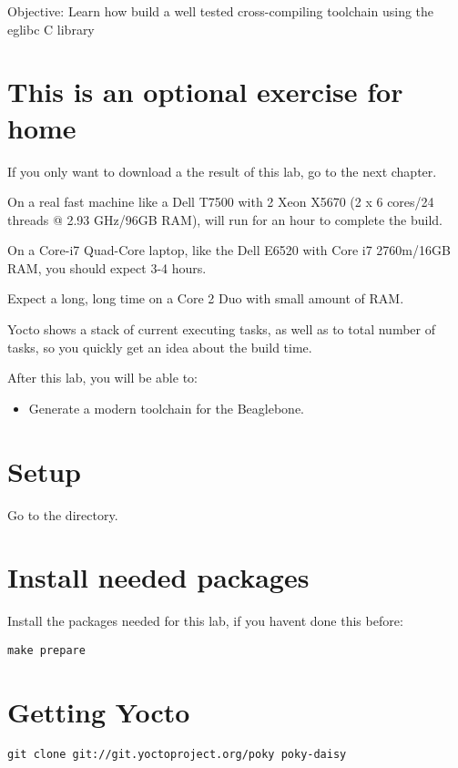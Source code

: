   {Objective: Learn how build a well tested cross-compiling toolchain using the eglibc C
  library}

\section{This is an optional exercise for home}

If you only want to download a the result of this lab, go to the next chapter.

On a real fast machine like a Dell T7500 with 2 Xeon X5670 (2 x 6 cores/24 threads @ 2.93 GHz/96GB RAM),
 will run for an hour to complete the build.

On a Core-i7 Quad-Core laptop, like the Dell E6520 with Core i7 2760m/16GB RAM, you should expect 3-4 hours.

Expect a long, long time on a Core 2 Duo with small amount of RAM.

Yocto shows a stack of current executing tasks, as well as to total number of tasks,
so you quickly get an idea about the build time.

After this lab, you will be able to:

\begin{itemize}
\item Generate a modern toolchain for the Beaglebone.
\end{itemize}

\section{Setup}

Go to the \labdir directory.

\section{Install needed packages}

Install the packages needed for this lab, if you havent done this before:

\begin{verbatim}
make prepare
\end{verbatim}

\section{Getting Yocto}

\begin{verbatim}
git clone git://git.yoctoproject.org/poky poky-daisy
\end{verbatim}

